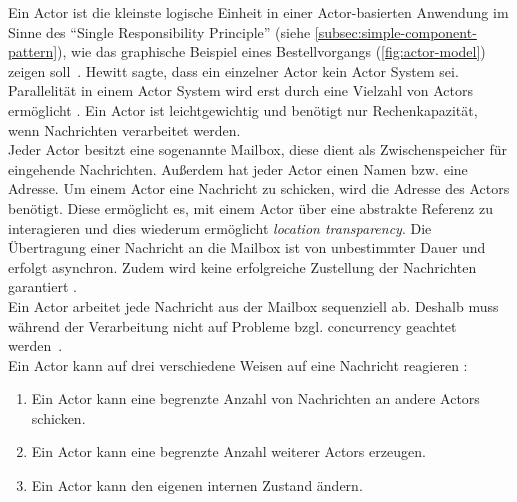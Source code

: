 Ein Actor ist die kleinste logische Einheit in einer Actor-basierten Anwendung im Sinne des \enquote{Single Responsibility Principle} (siehe \ref{subsec:simple-component-pattern}), wie das graphische Beispiel eines Bestellvorgangs (\autoref{fig:actor-model}) zeigen soll~\cite[S.~13]{vernon_reactive_2016}. Hewitt sagte, dass ein einzelner Actor kein Actor System sei. Parallelität in einem Actor System wird erst durch eine Vielzahl von Actors ermöglicht \cite[S.~15]{vernon_reactive_2016}. Ein Actor ist leichtgewichtig und benötigt nur Rechenkapazität, wenn Nachrichten verarbeitet werden.\\
Jeder Actor besitzt eine sogenannte Mailbox, diese dient als Zwischenspeicher für eingehende Nachrichten. Außerdem hat jeder Actor einen Namen bzw. eine Adresse. Um einem Actor eine Nachricht zu schicken, wird die Adresse des Actors benötigt. Diese ermöglicht es, mit einem Actor über eine abstrakte Referenz zu interagieren und dies wiederum ermöglicht \textit{location transparency}. Die Übertragung einer Nachricht an die Mailbox ist von unbestimmter Dauer und erfolgt asynchron. Zudem wird keine erfolgreiche Zustellung der Nachrichten garantiert \cite[S.~84]{erb_concurrent_2012} \cite[S.~83]{kuhn_reactive_2015}.\\
Ein Actor arbeitet jede Nachricht aus der Mailbox sequenziell ab. Deshalb muss während der Verarbeitung nicht auf Probleme bzgl. \gls{concurrency} geachtet werden~\cite[S.~14]{vernon_reactive_2016}.\\
Ein Actor kann auf drei verschiedene Weisen auf eine Nachricht reagieren \cite[S.~84]{erb_concurrent_2012}:

\begin{enumerate}
\item Ein Actor kann eine begrenzte Anzahl von Nachrichten an andere Actors schicken.
\item Ein Actor kann eine begrenzte Anzahl weiterer Actors erzeugen.
\item Ein Actor kann den eigenen internen Zustand ändern.
\end{enumerate}

